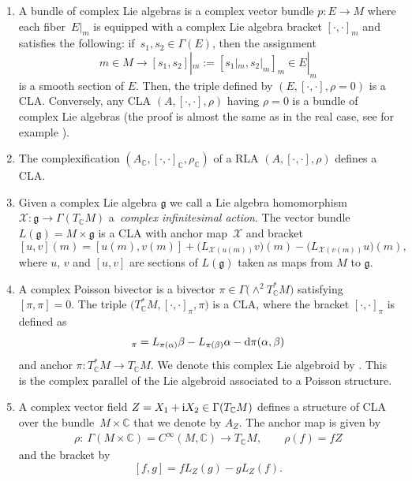 \documentclass[pdftex]{sigma}
\numberwithin{equation}{section}
\newcommand{\C}{{\mathbb{C}}}
\newcommand{\g}{\mathfrak{g}}
\begin{document}
\begin{Examples}
\begin{enumerate}
\item A bundle of complex Lie algebras is a complex vector bundle $p\colon E\to M$ where each fiber~$E|_m$ is equipped with a complex Lie algebra bracket $[\cdot,\cdot]_m$ and satisfies the following: if~${s_1, s_2\in \Gamma(E)}$, then the assignment
\[
  m\in M\to [s_1,s_2]|_m:= [s_1|_m,s_2|_m]_m\in E|_m
\]
is a smooth section of $E$. Then, the triple defined by $(E,[\cdot,\cdot], \rho=0)$ is a CLA.
Conversely, any CLA $(A,[\cdot,\cdot],\rho)$ having $\rho=0$ is a bundle of complex Lie algebras (the proof is almost the same as in the real case, see for example \cite[Section~16.2]{da1999geometric}).
\item The complexification $(A_{\C}, [\cdot,\cdot]_{\C},\rho_{\C})$ of a RLA $(A, [\cdot,\cdot],\rho)$ defines a CLA.
\item Given a complex Lie algebra $\mathfrak{g}$ we call a Lie algebra homomorphism
$\mathcal{X}\colon \mathfrak{g}\to \Gamma(T_{\C}M)$ a~{\em complex infinitesimal action}. The vector bundle $L(\g)=M\times \g$ is a CLA with anchor map~$\mathcal{X}$ and bracket
\[[u,v](m)=[u(m), v(m)]+\bigl(L_{\mathcal{X}(u(m))}v\bigr)(m)-\bigl(L_{\mathcal{X}(v(m))}u\bigr)(m),\]
where $u$, $v$ and $[u,v]$ are sections of $L(\g)$ taken as maps from $M$ to $\g$.

\item%
A complex Poisson bivector is a bivector $\pi \in \Gamma\bigl(\wedge^{2}T^*_{\C}M\bigr)$ satisfying $[\pi,\pi]=0$. The triple $\bigl(T^*_{\C}M, [\cdot, \cdot]_{\pi}, \pi\bigr)$ is a CLA, where the bracket $[\cdot, \cdot]_{\pi}$ is defined as
\begin{equation*}%
[\alpha,\beta]_{\pi}=L_{\pi(\alpha)}\beta-L_{\pi(\beta)}\alpha- {\rm d}\pi(\alpha,\beta)
\end{equation*}
and anchor $\pi\colon T^*_{\C}M\to T_{\C}M$. We denote this complex Lie algebroid by \smash{$\bigl(T_{\C}^* M\bigr)_{\pi}$}. This is the complex parallel of the Lie algebroid associated to a Poisson structure.
\item A complex vector field $Z=X_1+{\rm i}X_2\in \Gamma(T_{\C}M)$ defines a structure of CLA over the bundle~${M\times \C}$ that we denote by $A_{Z}$. The anchor map is given by
\begin{align*}
 \rho\colon \ \Gamma(M\times\C)=C^{\infty}(M,\C)\to T_{\C}M,\qquad \rho(f)=fZ
\end{align*} and the bracket by
\[[f,g]=f L_Z (g)-g L_Z (f).\]
\end{enumerate}
\end{Examples}
\end{document}
